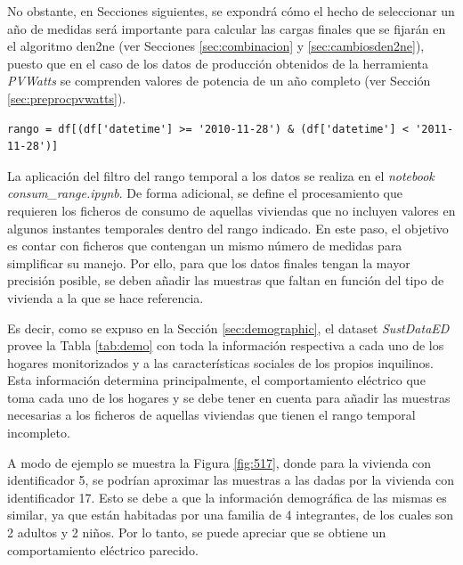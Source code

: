 \vspace{3mm}

No obstante, en Secciones siguientes, se expondrá cómo el hecho de seleccionar un año de medidas será importante para calcular las cargas finales que se fijarán en el algoritmo \gls{den2ne} (ver Secciones \ref{sec:combinacion} y \ref{sec:cambiosden2ne}), puesto que en el caso de los datos de producción obtenidos de la herramienta \textit{PVWatts} se comprenden valores de potencia de un año completo (ver Sección \ref{sec:preprocpvwatts}).

\vspace{3mm}

\begin{lstlisting}[style=Python, caption={Aplicación del rango temporal a los ficheros}]
rango = df[(df['datetime'] >= '2010-11-28') & (df['datetime'] < '2011-11-28')] 
\end{lstlisting}

\vspace{3mm}

\pagebreak

La aplicación del filtro del rango temporal a los datos se realiza en el \textit{notebook} \textit{consum\_range.ipynb}. De forma adicional, se define el procesamiento que requieren los ficheros de consumo de aquellas viviendas que no incluyen valores en algunos instantes temporales dentro del rango indicado. En este paso, el objetivo es contar con ficheros que contengan un mismo número de medidas para simplificar su manejo. Por ello, para que los datos finales tengan la mayor precisión posible, se deben añadir las muestras que faltan en función del tipo de vivienda a la que se hace referencia. 

\vspace{3mm}

Es decir, como se expuso en la Sección \ref{sec:demographic}, el dataset \textit{SustDataED} provee la Tabla \ref{tab:demo} con toda la información respectiva a cada uno de los hogares monitorizados y a las características sociales de los propios inquilinos. Esta información determina principalmente, el comportamiento eléctrico que toma cada uno de los hogares y se debe tener en cuenta para añadir las muestras necesarias a los ficheros de aquellas viviendas que tienen el rango temporal incompleto. 

\vspace{3mm}

A modo de ejemplo se muestra la Figura \ref{fig:517}, donde para la vivienda con identificador 5, se podrían aproximar las muestras a las dadas por la vivienda con identificador 17. Esto se debe a que la información demográfica de las mismas es similar, ya que están habitadas por una familia de 4 integrantes, de los cuales son 2 adultos y 2 niños. Por lo tanto, se puede apreciar que se obtiene un comportamiento eléctrico parecido. 

